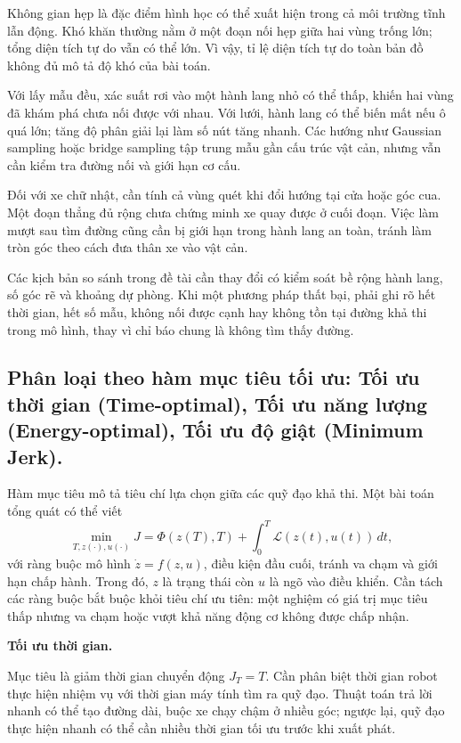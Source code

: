 \documentclass[12pt,a4paper,oneside]{report}
\begin{document}
Không gian hẹp là đặc điểm hình học có thể xuất hiện trong cả môi trường tĩnh lẫn động. Khó khăn thường nằm ở một đoạn nối hẹp giữa hai vùng trống lớn; tổng diện tích tự do vẫn có thể lớn. Vì vậy, tỉ lệ diện tích tự do toàn bản đồ không đủ mô tả độ khó của bài toán.

Với lấy mẫu đều, xác suất rơi vào một hành lang nhỏ có thể thấp, khiến hai vùng đã khám phá chưa nối được với nhau. Với lưới, hành lang có thể biến mất nếu ô quá lớn; tăng độ phân giải lại làm số nút tăng nhanh. Các hướng như Gaussian sampling hoặc bridge sampling tập trung mẫu gần cấu trúc vật cản, nhưng vẫn cần kiểm tra đường nối và giới hạn cơ cấu.

Đối với xe chữ nhật, cần tính cả vùng quét khi đổi hướng tại cửa hoặc góc cua. Một đoạn thẳng đủ rộng chưa chứng minh xe quay được ở cuối đoạn. Việc làm mượt sau tìm đường cũng cần bị giới hạn trong hành lang an toàn, tránh làm tròn góc theo cách đưa thân xe vào vật cản.

Các kịch bản so sánh trong đề tài cần thay đổi có kiểm soát bề rộng hành lang, số góc rẽ và khoảng dự phòng. Khi một phương pháp thất bại, phải ghi rõ hết thời gian, hết số mẫu, không nối được cạnh hay không tồn tại đường khả thi trong mô hình, thay vì chỉ báo chung là không tìm thấy đường.

\subsection{Phân loại theo hàm mục tiêu tối ưu: Tối ưu thời gian (Time-optimal), Tối ưu năng lượng (Energy-optimal), Tối ưu độ giật (Minimum Jerk).}

Hàm mục tiêu mô tả tiêu chí lựa chọn giữa các quỹ đạo khả thi. Một bài toán tổng quát có thể viết
\[
  \min_{T,z(\cdot),u(\cdot)} J
  =\Phi(z(T),T)+\int_0^T \mathcal{L}(z(t),u(t))\,dt,
\]
với ràng buộc mô hình \(\dot z=f(z,u)\), điều kiện đầu cuối, tránh va chạm và giới hạn chấp hành. Trong đó, \(z\) là trạng thái còn \(u\) là ngõ vào điều khiển. Cần tách các ràng buộc bắt buộc khỏi tiêu chí ưu tiên: một nghiệm có giá trị mục tiêu thấp nhưng va chạm hoặc vượt khả năng động cơ không được chấp nhận.

\noindent\textbf{Tối ưu thời gian.}

Mục tiêu là giảm thời gian chuyển động \(J_T=T\). Cần phân biệt thời gian robot thực hiện nhiệm vụ với thời gian máy tính tìm ra quỹ đạo. Thuật toán trả lời nhanh có thể tạo đường dài, buộc xe chạy chậm ở nhiều góc; ngược lại, quỹ đạo thực hiện nhanh có thể cần nhiều thời gian tối ưu trước khi xuất phát.
\end{document}
